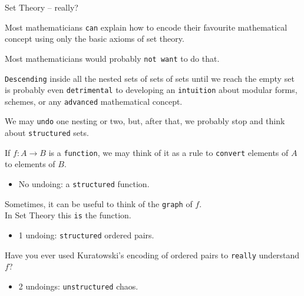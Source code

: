\documentclass{beamer}
\begin{document}
\begin{frame}[fragile]{Set Theory -- really?}

Most mathematicians {\color{violet}\verb`can`} explain how to encode their favourite mathematical concept using only the basic axioms of set theory.

Most mathematicians would probably {\color{violet}\verb`not want`} to do that.

{\color{violet}\verb`Descending`} inside all the nested sets of sets of sets until we reach the empty set is probably even {\color{violet}\verb`detrimental`} to developing an {\color{violet}\verb`intuition`} about modular forms, schemes, or any {\color{violet}\verb`advanced`} mathematical concept.
\end{frame}

\begin{frame}[fragile]

We may {\color{violet}\verb`undo`} one nesting or two, but, after that, we probably stop and think about {\color{violet}\verb`structured`} sets.

If $f \colon A \longrightarrow B$ is a {\color{violet}\verb`function`}, we may think of it as a rule to {\color{violet}\verb`convert`} elements of $A$ to elements of $B$.
\vspace{-18pt}
\begin{itemize}
\setlength\itemsep{-18pt}
\item
  No undoing: a {\color{violet}\verb`structured`} function.
\end{itemize}

Sometimes, it can be useful to think of the {\color{violet}\verb`graph`} of $f$.
\\
In Set Theory this {\color{violet}\verb`is`} the function.
\vspace{-18pt}
\begin{itemize}
\setlength\itemsep{-18pt}
\item
  1 undoing: {\color{violet}\verb`structured`} ordered pairs.
\end{itemize}

Have you ever used Kuratowski's encoding of ordered pairs to {\color{violet}\verb`really`} understand $f$?
\vspace{-18pt}
\begin{itemize}
\setlength\itemsep{-18pt}
\item
  2 undoings: {\color{violet}\verb`unstructured`} chaos.
\end{itemize}
\end{frame}
\end{document}
